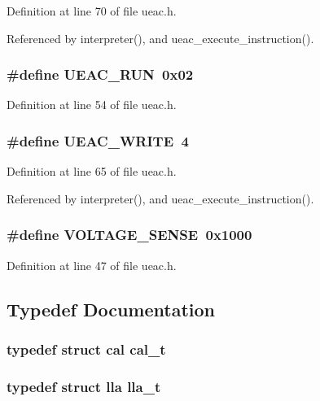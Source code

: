 Definition at line 70 of file ueac.h.

Referenced by interpreter(), and ueac\_\-execute\_\-instruction().
\subsubsection{\setlength{\rightskip}{0pt plus 5cm}\#define UEAC\_\-RUN~0x02}\label{ueac_8h_a5}




Definition at line 54 of file ueac.h.
\subsubsection{\setlength{\rightskip}{0pt plus 5cm}\#define UEAC\_\-WRITE~4}\label{ueac_8h_a12}




Definition at line 65 of file ueac.h.

Referenced by interpreter(), and ueac\_\-execute\_\-instruction().
\subsubsection{\setlength{\rightskip}{0pt plus 5cm}\#define VOLTAGE\_\-SENSE~0x1000}\label{ueac_8h_a0}




Definition at line 47 of file ueac.h.

\subsection{Typedef Documentation}
\subsubsection{\setlength{\rightskip}{0pt plus 5cm}typedef struct {\bf cal}  {\bf cal\_\-t}}\label{ueac_8h_a23}


\subsubsection{\setlength{\rightskip}{0pt plus 5cm}typedef struct {\bf lla}  {\bf lla\_\-t}}\label{ueac_8h_a22}


